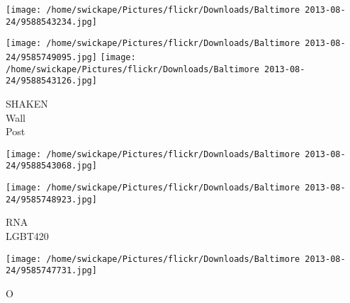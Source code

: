 \documentclass[10pt,letterpaper]{article}
\begin{document}
\texttt{[image: /home/swickape/Pictures/flickr/Downloads/Baltimore 2013-08-24/9588543234.jpg]}

\vspace{0.25in}
\texttt{[image: /home/swickape/Pictures/flickr/Downloads/Baltimore 2013-08-24/9585749095.jpg]}
\texttt{[image: /home/swickape/Pictures/flickr/Downloads/Baltimore 2013-08-24/9588543126.jpg]}

SHAKEN\\
Wall\\
Post
\pagebreak

\texttt{[image: /home/swickape/Pictures/flickr/Downloads/Baltimore 2013-08-24/9588543068.jpg]}

\vspace{0.25in}
\texttt{[image: /home/swickape/Pictures/flickr/Downloads/Baltimore 2013-08-24/9585748923.jpg]}

RNA\\
LGBT420
\pagebreak

\texttt{[image: /home/swickape/Pictures/flickr/Downloads/Baltimore 2013-08-24/9585747731.jpg]}

O
\pagebreak
\end{document}
